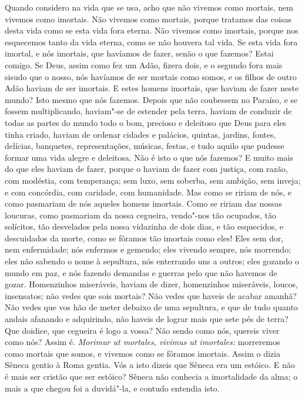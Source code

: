 Quando considero na vida que se usa, acho que não vivemos como mortais,
nem vivemos como imortais. Não vivemos como mortais, porque tratamos das
coisas desta vida como se esta vida fora eterna. Não vivemos como
imortais, porque nos esquecemos tanto da vida eterna, como se não
houvera tal vida. Se esta vida fora imortal, e nós imortais, que
havíamos de fazer, senão o que fazemos? Estai comigo. Se Deus, assim
como fez um Adão, fizera dois, e o segundo fora mais sisudo que o nosso,
nós havíamos de ser mortais como somos, e os filhos de outro Adão haviam
de ser imortais. E estes homens imortais, que haviam de fazer neste
mundo? Isto mesmo que nós fazemos. Depois que não coubessem no Paraíso,
e se fossem multiplicando, haviam"-se de estender pela terra, haviam de
conduzir de todas as partes do mundo todo o bom, precioso e deleitoso
que Deus para eles tinha criado, haviam de ordenar cidades e palácios,
quintas, jardins, fontes, delícias, banquetes, representações, músicas,
festas, e tudo aquilo que pudesse formar uma vida alegre e deleitosa.
Não é isto o que nós fazemos? E muito mais do que eles haviam de fazer,
porque o haviam de fazer com justiça, com razão, com modéstia, com
temperança; sem luxo, sem soberba, sem ambição, sem inveja; e com
concórdia, com caridade, com humanidade. Mas como se ririam de nós, e
como pasmariam de nós aqueles homens imortais. Como se ririam das nossas
loucuras, como pasmariam da nossa cegueira, vendo"-nos tão ocupados, tão
solícitos, tão desvelados pela nossa vidazinha de dois dias, e tão
esquecidos, e descuidados da morte, como se fôramos tão imortais como
eles! Eles sem dor, nem enfermidade; nós enfermos e gemendo; eles
vivendo sempre, nós morrendo; eles não sabendo o nome à sepultura, nós
enterrando uns a outros; eles gozando o mundo em paz, e nós fazendo
demandas e guerras pelo que não havemos de gozar. Homenzinhos
miseráveis, haviam de dizer, homenzinhos miseráveis, loucos,
insensatos; não
vedes que sois mortais? Não vedes que haveis de acabar amanhã? Não vedes
que vos hão de meter debaixo de uma sepultura, e que de tudo quanto
andais afanando e adquirindo, não haveis de lograr mais que sete pés de
terra? Que doidice, que cegueira é logo a vossa? Não sendo como nós,
quereis viver como nós? Assim é. \emph{Morimur ut mortales, vivimus
ut imortales:} morreremos como mortais que somos, e vivemos como se
fôramos imortais. Assim o dizia Sêneca gentio à Roma gentia. Vós a
isto dizeis que Sêneca era um estóico. E não é mais ser cristão que ser
estóico? Sêneca não conhecia a imortalidade da alma; o mais a que chegou
foi a duvidá"-la, e contudo entendia isto.

